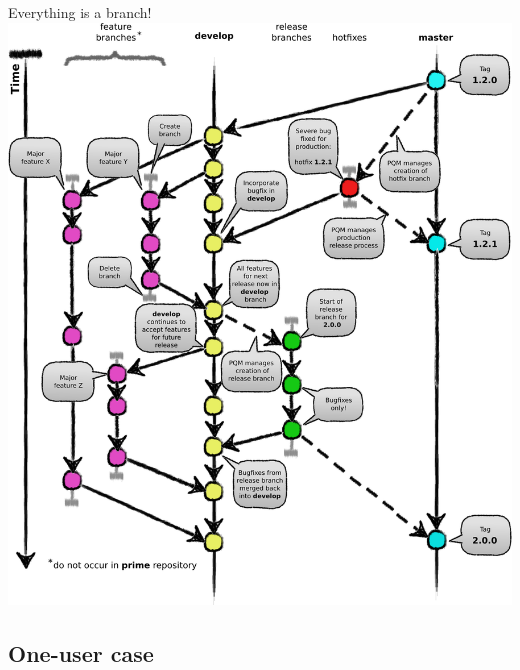 

\begin{frame}{Everything is a branch!}
	\includegraphics[height=0.9\textheight, width=\textwidth]{gitflow}
\end{frame}

\subsection{One-user case}

